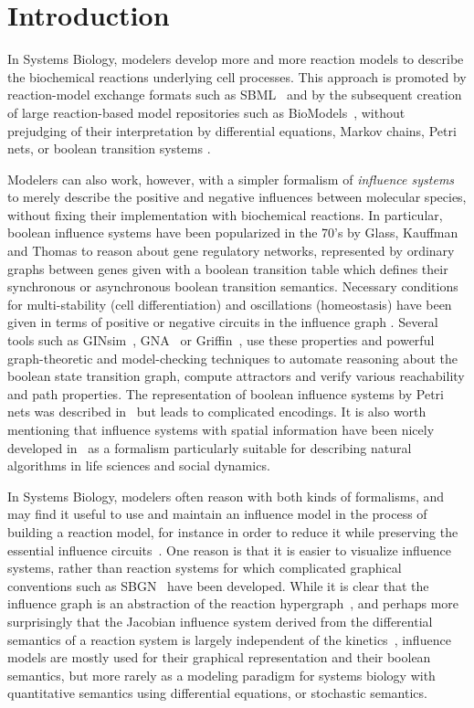 \documentclass{llncs}
\begin{document}
\section{Introduction}

In Systems Biology, modelers develop more and more reaction models to describe the biochemical reactions underlying cell processes.
This approach is promoted by reaction-model exchange formats such as SBML~\cite{Hucka03bi}
and by the subsequent creation of large reaction-based model repositories such as BioModels~\cite{NBBCDDLSSSSH06nar},
without prejudging of their interpretation by differential equations, Markov chains, Petri nets, or boolean transition systems \cite{FS08tcs}.

Modelers can also work, however, with a simpler formalism of \emph{influence systems}
to merely describe the positive and negative influences between molecular species,
without fixing their implementation with biochemical reactions.
In particular, boolean influence systems have been popularized in the 70's by Glass, Kauffman \cite{GK73jtb}
and Thomas \cite{Thomas73jtb,TA90book}
to reason about gene regulatory networks, represented by ordinary graphs between genes
given with a boolean transition table which defines their synchronous or asynchronous boolean transition semantics.
Necessary conditions for multi-stability (cell differentiation) and oscillations (homeostasis) have been given in terms of
positive or negative circuits in the influence graph \cite{RRT08aam,Ruet16mfcs}.
Several tools such as GINsim~\cite{NBFLTC09bs}, GNA~\cite{BBCdJDGMMPRR12} or Griffin~\cite{RMCA14alcob},
use these properties and powerful graph-theoretic and model-checking techniques to automate reasoning
about the boolean state transition graph, compute attractors and verify various reachability and path properties.
The representation of boolean influence systems by Petri nets was described in~\cite{Chaouiya07bioinfo}
but leads to complicated encodings.
It is also worth mentioning that influence systems with spatial information have been nicely developed in~\cite{Chazelle12cacm}
as a formalism particularly suitable for describing natural algorithms
in life sciences and social dynamics.

  In Systems Biology, modelers often reason with both kinds of formalisms, and may find it useful to use and maintain an influence model
  in the process of building a reaction model,
  for instance in order to reduce it
while preserving the essential influence circuits~\cite{NRTC09cmsb}.
One reason is that it is easier to visualize influence systems,
rather than reaction systems for which %
complicated graphical conventions such as SBGN~\cite{sbgn09nb}
have been developed.
  While it is clear that the influence graph is an abstraction of the reaction hypergraph~\cite{FS08tcs},
  and perhaps more surprisingly that the Jacobian influence system derived
  from the differential semantics of a reaction system is largely independent of the kinetics~\cite{FS08fmsb},
  influence models are mostly used for their graphical representation and their boolean semantics,
  but more rarely as a modeling paradigm for systems biology with quantitative semantics using differential equations, or stochastic semantics.
  
\end{document}
